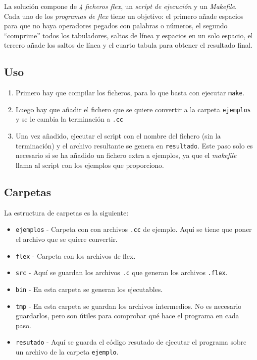 \documentclass[10pt]{article}
\begin{document}
    La solución compone de \emph{4 ficheros flex}, un \emph{script de ejecución} y un \emph{Makefile}. Cada uno de los \emph{programas de flex} tiene un objetivo: el primero añade espacios para que no haya operadores pegados con palabras o números, el segundo ``comprime'' todos los tabuladores, saltos de línea y espacios en un solo espacio, el tercero añade los saltos de línea y el cuarto tabula para obtener el resultado final.

    \subsection{Uso}

    \begin{enumerate}
        \item Primero hay que compilar los ficheros, para lo que basta con ejecutar \texttt{make}.
        \item Luego hay que añadir el fichero que se quiere convertir a la carpeta \texttt{ejemplos} y se le cambia la terminación a \texttt{.cc}
        \item Una vez añadido, ejecutar el script con el nombre del fichero (sin la terminación) y el archivo resultante se genera en \texttt{resultado}. Este paso solo es necesario si se ha añadido un fichero extra a ejemplos, ya que el \emph{makefile} llama al script con los ejemplos que proporciono.
    \end{enumerate}

    \subsection{Carpetas}
    
    La estructura de carpetas es la siguiente:

    \begin{itemize}
        \item \texttt{ejemplos} - Carpeta con con archivos \texttt{.cc} de ejemplo. Aquí se tiene que poner el archivo que se quiere convertir.
        \item \texttt{flex} - Carpeta con los archivos de flex.
        \item \texttt{src} - Aquí se guardan los archivos \texttt{.c} que generan los archivos \texttt{.flex}.
        \item \texttt{bin} - En esta carpeta se generan los ejecutables.
        \item \texttt{tmp} - En esta carpeta se guardan los archivos intermedios. No es necesario guardarlos, pero son útiles para comprobar qué hace el programa en cada paso.
        \item \texttt{resutado} - Aquí se guarda el código resutado de ejecutar el programa sobre un archivo de la carpeta \texttt{ejemplo}.
    \end{itemize}
\end{document}
